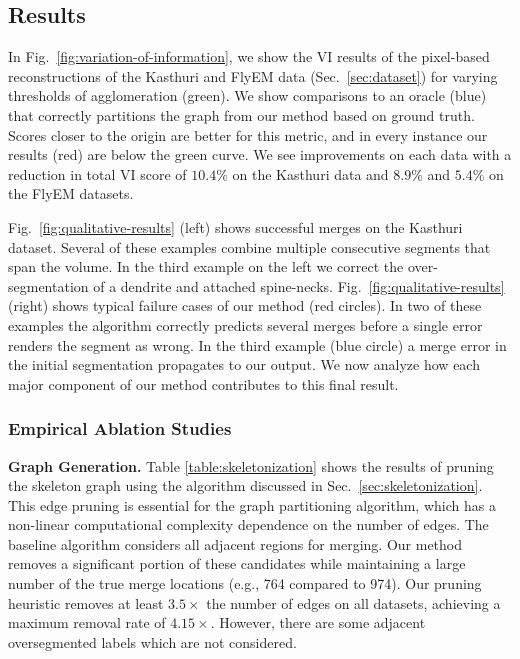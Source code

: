 \subsection{Results}


In Fig.~\ref{fig:variation-of-information}, we show the VI results of the pixel-based reconstructions of the Kasthuri and FlyEM data (Sec.~\ref{sec:dataset}) for varying thresholds of agglomeration (green). 
We show comparisons to an oracle (blue) that correctly partitions the graph from our method based on ground truth.
Scores closer to the origin are better for this metric, and in every instance our results (red) are below the green curve.
We see improvements on each data with a reduction in total VI score of $10.4\%$ on the Kasthuri data and $8.9\%$ and $5.4\%$ on the FlyEM datasets.

Fig.~\ref{fig:qualitative-results} (left) shows successful merges on the Kasthuri dataset. 
Several of these examples combine multiple consecutive segments that span the volume.
In the third example on the left we correct the over-segmentation of a dendrite and attached spine-necks.
Fig.~\ref{fig:qualitative-results} (right) shows typical failure cases of our method (red circles).
In two of these examples the algorithm correctly predicts several merges before a single error renders the segment as wrong.
In the third example (blue circle) a merge error in the initial segmentation propagates to our output.
We now analyze how each major component of our method contributes to this final result.

\subsubsection{Empirical Ablation Studies}

\noindent\textbf{Graph Generation.}
Table \ref{table:skeletonization} shows the results of pruning the skeleton graph using the algorithm discussed in Sec.~\ref{sec:skeletonization}. 
This edge pruning is essential for the graph partitioning algorithm, which has a non-linear computational complexity dependence on the number of edges. 
The baseline algorithm considers all adjacent regions for merging. 
Our method removes a significant portion of these candidates while maintaining a large number of the true merge locations (e.g., 764 compared to 974). 
Our pruning heuristic removes at least $3.5\times$ the number of edges on all datasets, achieving a maximum removal rate of $4.15\times$.
However, there are some adjacent oversegmented labels which are not considered. 

